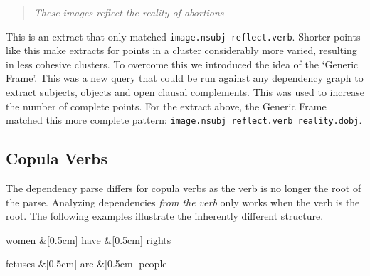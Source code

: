       \bigskip
      \begin{center}
        \blockquote{\textit{These images reflect the reality of abortions}}
      \end{center}

      This is an extract that only matched \texttt{image.nsubj reflect.verb}. Shorter points like this make extracts for points in a cluster considerably more varied, resulting in less cohesive clusters. To overcome this we introduced the idea of the `Generic Frame'. This was a new query that could be run against any dependency graph to extract subjects, objects and open clausal complements. This was used to increase the number of complete points. For the extract above, the Generic Frame matched this more complete pattern: \texttt{image.nsubj reflect.verb reality.dobj}.

    \tocless\subsection{Copula Verbs}
      The dependency parse differs for copula verbs as the verb is no longer the root of the parse. Analyzing dependencies \textit{from the verb} only works when the verb is the root. The following examples illustrate the inherently different structure.
      \begin{multicols}{2}
        \raggedcolumns
        \begin{center}
          \begin{dependency}[edge horizontal padding=0]
            \begin{deptext}
              women \&[0.5cm] have \&[0.5cm] rights \\
            \end{deptext}
          \end{dependency}
        \end{center}
        \columnbreak
        \begin{center}
          \begin{dependency}[edge horizontal padding=0]
            \begin{deptext}
              fetuses \&[0.5cm] are \&[0.5cm] people \\
            \end{deptext}
          \end{dependency}
        \end{center}
      \end{multicols}

